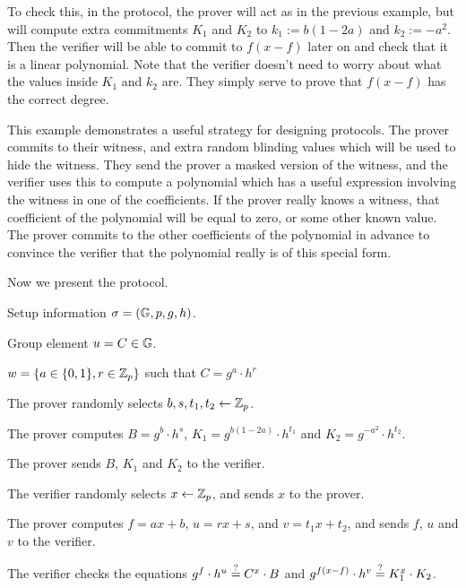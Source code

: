 To check this, in the protocol, the prover will act as in the previous example, but will compute extra commitments $K_1$ and $K_2$ to $k_1 := b(1-2a)$ and $k_2 := -a^2$. Then the verifier will be able to commit to $f(x-f)$ later on and check that it is a linear polynomial. Note that the verifier doesn't need to worry about what the values inside $K_1$ and $k_2$ are. They simply serve to prove that $f(x-f)$ has the correct degree.

This example demonstrates a useful strategy for designing protocols. The prover commits to their witness, and extra random blinding values which will be used to hide the witness. They send the prover a masked version of the witness, and the verifier uses this to compute a polynomial which has a useful expression involving the witness in one of the coefficients. If the prover really knows a witness, that coefficient of the polynomial will be equal to zero, or some other known value. The prover commits to the other coefficients of the polynomial in advance to convince the verifier that the polynomial really is of this special form.

Now we present the protocol.

\begin{description}\label{prot:combits}
\item[Common input:] Setup information $\mathsf{\sigma} = (\mathbb{G},p,g,h)$.
\item [Instance:] Group element $u = C \in \mathbb{G}$.
\item[Prover's witness:] $w = \lbrace a \in \lbrace 0,1 \rbrace, r \in \mathbb{Z}_p \rbrace$ such that $C = g^a \cdot h^r$
\item[Protocol:]
\item[\ P:] The prover randomly selects $b,s,t_1,t_2 \gets \mathbb{Z}_p$.

The prover computes $B = g^b \cdot h^s$, $K_1 = g^{b(1-2a)} \cdot h^{t_1}$ and $K_2 = g^{-a^2} \cdot h^{t_2}$.

The prover sends $B$, $K_1$ and $K_2$ to the verifier.

\item[\ V:] The verifier randomly selects $x\gets \mathbb{Z}_p$, and sends $x$ to the prover.

\item[\ P:] The prover computes $f = ax + b$, $u = rx+s$, and $v = t_1 x + t_2$, and sends $f$, $u$ and $v$ to the verifier.

\item[\ V:] The verifier checks the equations $g^f \cdot h^u \overset{?}{=} C^x \cdot B$ and $g^{f(x-f)} \cdot h^v \overset{?}{=} K_1^x \cdot K_2$.
\end{description}

